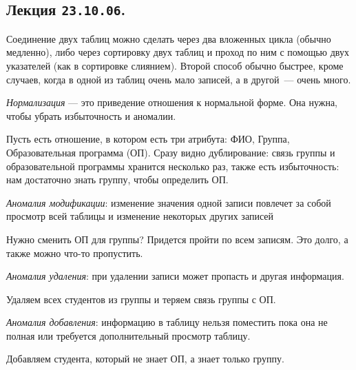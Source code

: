 \subsection{%
  Лекция \texttt{23.10.06}.%
}

Соединение двух таблиц можно сделать через два вложенных цикла (обычно
медленно), либо через сортировку двух таблиц и проход по ним с помощью двух
указателей (как в сортировке слиянием). Второй способ обычно быстрее, кроме
случаев, когда в одной из таблиц очень мало записей, а в другой~--- очень много.

\begin{definition}
  \textit{Нормализация} --- это приведение отношения к нормальной форме.
  Она нужна, чтобы убрать избыточность и аномалии.
\end{definition}

Пусть есть  отношение, в котором есть три атрибута: ФИО, Группа,
Образовательная программа (ОП). Сразу видно дублирование: связь группы и
образовательной программы хранится несколько раз, также есть избыточность: нам
достаточно знать группу, чтобы определить ОП.

\begin{definition}
  \textit{Аномалия модификации}: изменение значения одной записи повлечет за собой
  просмотр всей таблицы и изменение некоторых других записей
\end{definition}

\begin{example}
  Нужно сменить ОП для группы? Придется пройти по всем записям. Это долго, а
  также можно что-то пропустить.
\end{example}

\begin{definition}
  \textit{Аномалия удаления}: при удалении записи может пропасть и другая информация.
\end{definition}

\begin{example}
  Удаляем всех студентов из группы и теряем связь группы с ОП.
\end{example}

\begin{definition}
  \textit{Аномалия добавления}: информацию в таблицу нельзя поместить пока она 
  не полная или требуется дополнительный просмотр таблицу.
\end{definition}

\begin{example}
  Добавляем студента, который не знает ОП, а знает только группу.
\end{example}

